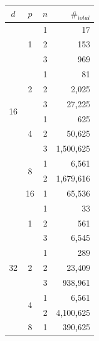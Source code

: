 \documentclass{article}
\numberwithin{equation}{section} %
\begin{document}
\quad \quad \quad \quad
\begin{tabular}{c|c|c|r}
  $d$                  & $p$              & $n$ & $\#_{total}$ \\ \hline
  \multirow{12}{*}{16} & \multirow{3}{*}{1} & 1 &        17 \\
                       &                    & 2 &       153 \\
                       &                    & 3 &       969 \\ \cline{2-4}
                       & \multirow{3}{*}{2} & 1 &        81 \\
                       &                    & 2 &     2,025 \\
                       &                    & 3 &    27,225 \\ \cline{2-4}
                       & \multirow{3}{*}{4} & 1 &       625 \\
                       &                    & 2 &    50,625 \\
                       &                    & 3 & 1,500,625 \\ \cline{2-4}
                       & \multirow{2}{*}{8} & 1 &     6,561 \\
                       &                    & 2 & 1,679,616 \\ \cline{2-4}
                       &                16  & 1 &    65,536 \\ \hline
  \multirow{9}{*}{32}  & \multirow{3}{*}{1} & 1 &        33 \\
                       &                    & 2 &       561 \\
                       &                    & 3 &     6,545 \\ \cline{2-4}
                       & \multirow{3}{*}{2} & 1 &       289 \\
                       &                    & 2 &    23,409 \\
                       &                    & 3 &   938,961 \\ \cline{2-4}
                       & \multirow{2}{*}{4} & 1 &     6,561 \\
                       &                    & 2 & 4,100,625 \\ \cline{2-4}
                       &                 8  & 1 &   390,625 \\ \hline
\end{tabular}
\quad \quad \quad \quad
\end{document}
